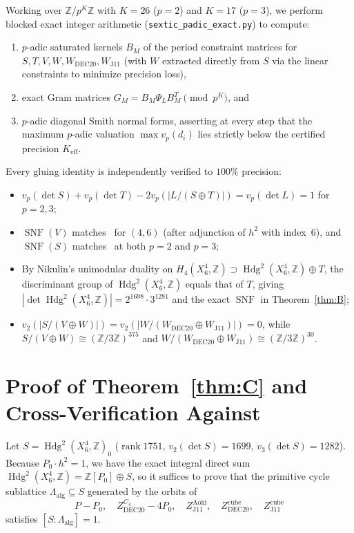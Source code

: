 \documentclass[11pt,a4paper]{amsart}
\theoremstyle{definition}
\newcommand{\ZZ}{\mathbb{Z}}
\newcommand{\Hdg}{\operatorname{Hdg}}
\newcommand{\SNF}{\operatorname{SNF}}
\newcommand{\rank}{\operatorname{rank}}
\begin{document}
Working over $\ZZ / p^K \ZZ$ with $K = 26$ ($p = 2$) and $K = 17$ ($p = 3$), we perform blocked exact integer arithmetic (\texttt{sextic\_padic\_exact.py}) to compute:
\begin{enumerate}
  \item $p$-adic saturated kernels $B_M$ of the period constraint matrices for $S, T, V, W, W_{\mathrm{DEC20}}, W_{\mathrm{J11}}$ (with $W$ extracted directly from $S$ via the linear constraints to minimize precision loss),
  \item exact Gram matrices $G_M = B_M \Psi_L B_M^T \pmod{p^K}$, and
  \item $p$-adic diagonal Smith normal forms, asserting at every step that the maximum $p$-adic valuation $\max v_p(d_i)$ lies strictly below the certified precision $K_{\mathrm{eff}}$.
\end{enumerate}
Every gluing identity is independently verified to $100\%$ precision:
\begin{itemize}
  \item $v_p(\det S) + v_p(\det T) - 2 v_p(|L/(S\oplus T)|) = v_p(\det L) = 1$ for $p = 2, 3$;
  \item $\SNF(V)$ matches~\cite[Table~1]{AMVL19} for $(4,6)$ (after adjunction of $h^2$ with index~$6$), and $\SNF(S)$ matches~\cite[Computation~2.2]{SdJ26} at both $p = 2$ and $p = 3$;
  \item By Nikulin's unimodular duality on $H_4(X_6^4, \ZZ) \supset \Hdg^2(X_6^4, \ZZ) \oplus T$, the discriminant group of $\Hdg^2(X_6^4, \ZZ)$ equals that of $T$, giving $|\det \Hdg^2(X_6^4, \ZZ)| = 2^{1698}\cdot 3^{1281}$ and the exact $\SNF$ in Theorem~\ref{thm:B};
  \item $v_2(|S/(V\oplus W)|) = v_2(|W/(W_{\mathrm{DEC20}}\oplus W_{\mathrm{J11}})|) = 0$, while $S/(V\oplus W) \cong (\ZZ/3\ZZ)^{375}$ and $W/(W_{\mathrm{DEC20}}\oplus W_{\mathrm{J11}}) \cong (\ZZ/3\ZZ)^{30}$.
\end{itemize}

\section{Proof of Theorem~\ref{thm:C} and Cross-Verification Against \texorpdfstring{\cite{SdJ26}}{Santana de Jesus (2026)}}

Let $S = \Hdg^2(X_6^4, \ZZ)_0$ ($\rank 1751$, $v_2(\det S) = 1699$, $v_3(\det S) = 1282$). Because $P_0 \cdot h^2 = 1$, we have the exact integral direct sum $\Hdg^2(X_6^4, \ZZ) = \ZZ[P_0] \oplus S$, so it suffices to prove that the primitive cycle sublattice $\Lambda_{\mathrm{alg}} \subseteq S$ generated by the orbits of
\[
  P - P_0,\quad Z_{\mathrm{DEC20}}^{C_4} - 4 P_0,\quad Z_{\mathrm{J11}}^{\mathrm{Aoki}},\quad Z_{\mathrm{DEC20}}^{\mathrm{cube}},\quad Z_{\mathrm{J11}}^{\mathrm{cube}}
\]
satisfies $[S : \Lambda_{\mathrm{alg}}] = 1$.
\end{document}

